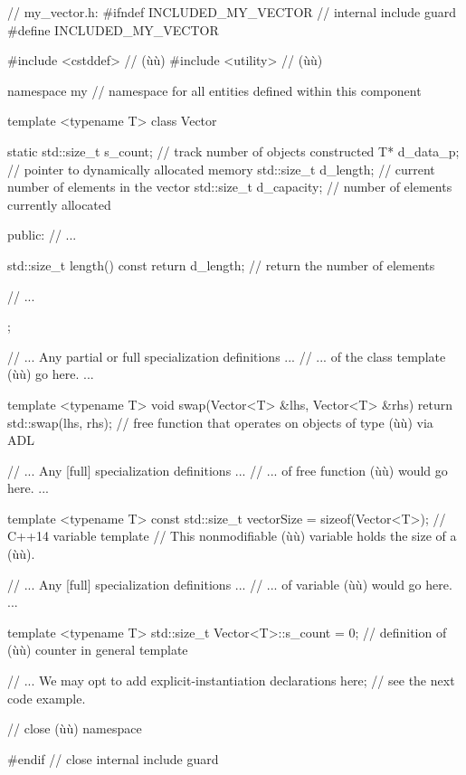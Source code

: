 \begin{emcppslisting}[emcppsbatch={e1,e1b}]
// my_vector.h:
#ifndef INCLUDED_MY_VECTOR  // internal include guard
#define INCLUDED_MY_VECTOR

#include <cstddef>  // (ù{}ù)
#include <utility>  // (ù{}ù)

namespace my  // namespace for all entities defined within this component
{

template <typename T>
class Vector
{
    static std::size_t s_count; // track number of objects constructed
    T* d_data_p;                // pointer to dynamically allocated memory
    std::size_t d_length;       // current number of elements in the vector
    std::size_t d_capacity;     // number of elements currently allocated

public:
    // ...

    std::size_t length() const { return d_length; }
        // return the number of elements

    // ...
};

// ...          Any partial or full specialization definitions            ...
// ...          of the class template (ù{}ù) go here.                     ...

template <typename T>
void swap(Vector<T> &lhs, Vector<T> &rhs) { return std::swap(lhs, rhs); }
    // free function that operates on objects of type (ù{}ù) via ADL

// ...            Any [full] specialization definitions                   ...
// ...            of free function (ù{}ù) would go here.                    ...

template <typename T>
const std::size_t vectorSize = sizeof(Vector<T>);  // C++14 variable template
    // This nonmodifiable (ù{}ù) variable holds the size of a (ù{}ù).

// ...           Any [full] specialization definitions                    ...
// ...           of variable (ù{}ù) would go here.                    ...

template <typename T>
std::size_t Vector<T>::s_count = 0;
    // definition of (ù{}ù) counter in general template

// ... We may opt to add explicit-instantiation declarations here;
//     see the next code example.

}  // close (ù{}ù) namespace

#endif  // close internal include guard
\end{emcppslisting}


